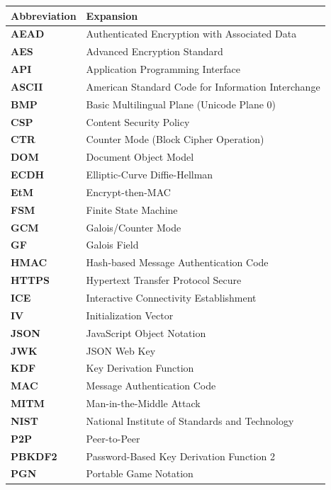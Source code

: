 \documentclass[12pt,a4paper,oneside,openany]{report}
\begin{document}
\begin{singlespace}
\noindent\centering
\small
\renewcommand{\arraystretch}{1.08}
\begin{tabular}{@{}p{2.8cm}p{11.8cm}@{}}
\toprule
\textbf{Abbreviation} & \textbf{Expansion} \\
\midrule
\textbf{AEAD}   & Authenticated Encryption with Associated Data \\
\textbf{AES}    & Advanced Encryption Standard \\
\textbf{API}    & Application Programming Interface \\
\textbf{ASCII}  & American Standard Code for Information Interchange \\
\textbf{BMP}    & Basic Multilingual Plane (Unicode Plane 0) \\
\textbf{CSP}    & Content Security Policy \\
\textbf{CTR}    & Counter Mode (Block Cipher Operation) \\
\textbf{DOM}    & Document Object Model \\
\textbf{ECDH}   & Elliptic-Curve Diffie-Hellman \\
\textbf{EtM}    & Encrypt-then-MAC \\
\textbf{FSM}    & Finite State Machine \\
\textbf{GCM}    & Galois/Counter Mode \\
\textbf{GF}     & Galois Field \\
\textbf{HMAC}   & Hash-based Message Authentication Code \\
\textbf{HTTPS}  & Hypertext Transfer Protocol Secure \\
\textbf{ICE}    & Interactive Connectivity Establishment \\
\textbf{IV}     & Initialization Vector \\
\textbf{JSON}   & JavaScript Object Notation \\
\textbf{JWK}    & JSON Web Key \\
\textbf{KDF}    & Key Derivation Function \\
\textbf{MAC}    & Message Authentication Code \\
\textbf{MITM}   & Man-in-the-Middle Attack \\
\textbf{NIST}   & National Institute of Standards and Technology \\
\textbf{P2P}    & Peer-to-Peer \\
\textbf{PBKDF2} & Password-Based Key Derivation Function 2 \\
\textbf{PGN}    & Portable Game Notation \\

\end{tabular}
\end{singlespace}
\end{document}
